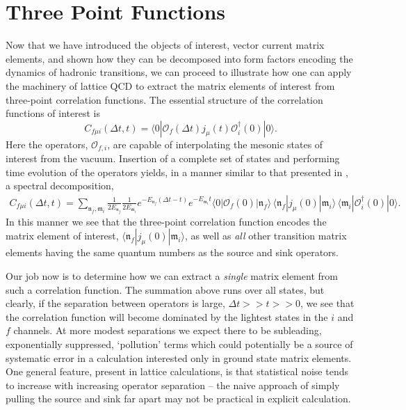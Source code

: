 \section{Three Point Functions} \label{sec::3ptFun}
Now that we have introduced the objects of interest, vector current matrix elements, and shown how they can be decomposed into form factors encoding the dynamics of hadronic transitions, we can proceed to illustrate how one can apply the machinery of lattice QCD to extract the matrix elements of interest from three-point correlation functions. The essential structure of the correlation functions of interest is 
\begin{equation}
C_{f\mu i}(\Delta t, t) = \langle 0 | \mathcal{O}_f(\Delta t) j_\mu(t) \mathcal{O}_i^\dagger(0) | 0 \rangle. 
\end{equation}
Here the operators, $\mathcal{O}_{f,i}$, are capable of interpolating the mesonic states of interest from the vacuum. Insertion of a complete set of states and performing time evolution of the operators yields, in a manner similar to that presented in , a spectral decomposition, 
\begin{align}
C_{f\mu i}(\Delta t, t) = \sum_{\mathfrak{n}_f,\mathfrak{m}_i} \frac{1}{2E_{\mathfrak{n}_f}}\frac{1}{2E_{\mathfrak{m}_i}}e^{-E_{\mathfrak{n}_f}(\Delta t -t)} e^{-E_{\mathfrak{m}_i}t}  \langle 0 | \mathcal{O}_f(0) | \mathfrak{n}_f \rangle \, \langle \mathfrak{n}_f |  j_\mu(0)  | \mathfrak{m}_i \rangle \, \langle \mathfrak{m}_i | \mathcal{O}_i^\dagger(0) | 0 \rangle. 
\end{align}
In this manner we see that the three-point correlation function encodes the matrix element of interest, $ \langle \mathfrak{n}_f |  j_\mu(0)  | \mathfrak{m}_i \rangle$, as well as \emph{all} other transition matrix elements having the same quantum numbers as the source and sink operators. 

Our job now is to determine how we can extract a \emph{single} matrix element from such a correlation function. The summation above runs over all states, but clearly, if the separation between operators is large, $\Delta t >> t >> 0 $, we see that the correlation function will become dominated by the lightest states in the $i$ and $f$ channels. At more modest separations we expect there to be subleading, exponentially suppressed, `pollution' terms which could potentially be a source of systematic error in a calculation interested only in ground state matrix elements. One general feature, present in lattice calculations, is that statistical noise tends to increase with increasing operator separation -- the naive approach of simply pulling the source and sink far apart may not be practical in explicit calculation. 

